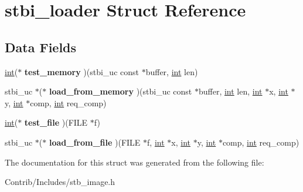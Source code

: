 \hypertarget{structstbi__loader}{}\section{stbi\+\_\+loader Struct Reference}
\label{structstbi__loader}
\subsection*{Data Fields}
\begin{DoxyCompactItemize}
\item 
\hyperlink{_s_d_l__thread_8h_a6a64f9be4433e4de6e2f2f548cf3c08e}{int}($\ast$ {\bfseries test\+\_\+memory} )(stbi\+\_\+uc const $\ast$buffer, \hyperlink{_s_d_l__thread_8h_a6a64f9be4433e4de6e2f2f548cf3c08e}{int} len)\hypertarget{structstbi__loader_a6ba754e5d75593c4644ba439411742c5}{}\label{structstbi__loader_a6ba754e5d75593c4644ba439411742c5}

\item 
stbi\+\_\+uc $\ast$($\ast$ {\bfseries load\+\_\+from\+\_\+memory} )(stbi\+\_\+uc const $\ast$buffer, \hyperlink{_s_d_l__thread_8h_a6a64f9be4433e4de6e2f2f548cf3c08e}{int} len, \hyperlink{_s_d_l__thread_8h_a6a64f9be4433e4de6e2f2f548cf3c08e}{int} $\ast$x, \hyperlink{_s_d_l__thread_8h_a6a64f9be4433e4de6e2f2f548cf3c08e}{int} $\ast$y, \hyperlink{_s_d_l__thread_8h_a6a64f9be4433e4de6e2f2f548cf3c08e}{int} $\ast$comp, \hyperlink{_s_d_l__thread_8h_a6a64f9be4433e4de6e2f2f548cf3c08e}{int} req\+\_\+comp)\hypertarget{structstbi__loader_a4ca08d6c75fa9b41f36729593193dad3}{}\label{structstbi__loader_a4ca08d6c75fa9b41f36729593193dad3}

\item 
\hyperlink{_s_d_l__thread_8h_a6a64f9be4433e4de6e2f2f548cf3c08e}{int}($\ast$ {\bfseries test\+\_\+file} )(F\+I\+LE $\ast$f)\hypertarget{structstbi__loader_a022fb001bcd5150f38284f5d1063ca9c}{}\label{structstbi__loader_a022fb001bcd5150f38284f5d1063ca9c}

\item 
stbi\+\_\+uc $\ast$($\ast$ {\bfseries load\+\_\+from\+\_\+file} )(F\+I\+LE $\ast$f, \hyperlink{_s_d_l__thread_8h_a6a64f9be4433e4de6e2f2f548cf3c08e}{int} $\ast$x, \hyperlink{_s_d_l__thread_8h_a6a64f9be4433e4de6e2f2f548cf3c08e}{int} $\ast$y, \hyperlink{_s_d_l__thread_8h_a6a64f9be4433e4de6e2f2f548cf3c08e}{int} $\ast$comp, \hyperlink{_s_d_l__thread_8h_a6a64f9be4433e4de6e2f2f548cf3c08e}{int} req\+\_\+comp)\hypertarget{structstbi__loader_a72b00457768cdc69dbefa61ad6c6721d}{}\label{structstbi__loader_a72b00457768cdc69dbefa61ad6c6721d}

\end{DoxyCompactItemize}


The documentation for this struct was generated from the following file\+:\begin{DoxyCompactItemize}
\item 
Contrib/\+Includes/stb\+\_\+image.\+h\end{DoxyCompactItemize}
